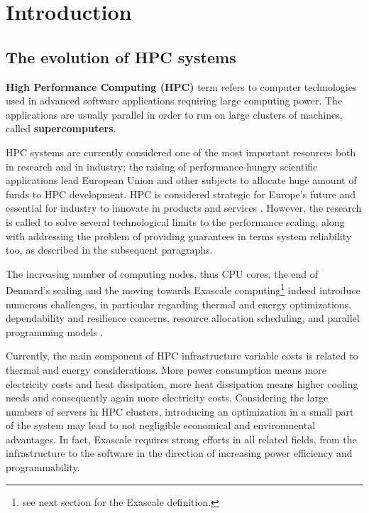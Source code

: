 \chapter{Introduction}
\label{cap:introduction}

\section{The evolution of HPC systems}
\textbf{High Performance Computing (HPC)} term refers to computer technologies
used in advanced software applications requiring large computing power. The
applications are usually parallel in order to run on large clusters of
machines, called \textbf{supercomputers}.

HPC systems are currently considered one
of the most important resources both in research and in industry; the raising
of performance-hungry scientific applications lead European Union and other
subjects to allocate huge amount of funds to HPC development. HPC is 
considered strategic
for Europe's future and essential for industry to innovate in products and
services \cite{EUstrategy}. However, the research is called to solve several
technological limits to the performance scaling, along with addressing
the problem of providing guarantees in terms system reliability too, as
described in the subsequent paragraphs.

The increasing number of computing nodes, thus CPU cores, the end of
Dennard's scaling \cite{esmaeilzadeh2011dark} and the moving towards Exascale
computing\footnote{see next section for the Exascale definition.} indeed
introduce numerous challenges, in particular regarding thermal and energy
optimizations, dependability and resilience concerns, resource allocation
scheduling, and parallel programming models \cite{shalf2010exascale}.

Currently, the main component of HPC infrastructure variable costs is related
to thermal and energy considerations. More power consumption means more
electricity costs and heat dissipation, more heat dissipation means higher
cooling needs and consequently again more electricity costs. Considering the
large numbers of servers in HPC clusters, introducing an optimization in a
small part of the system may lead to not negligible economical
and environmental advantages. In fact, Exascale requires strong efforts in all
related fields, from the infrastructure to the software in the direction of
increasing power efficiency and programmability.


